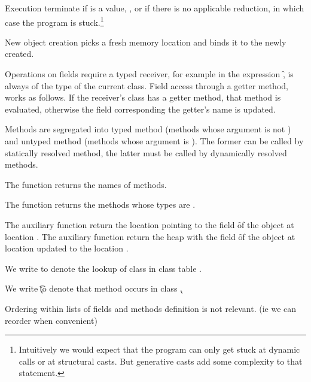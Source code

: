 \documentclass[a4paper,USenglish]{tex/lipics-v2016}
\begin{document}
Execution terminate if \ep\xspace is a value, \a, or if there is no applicable
reduction, in which case the program is stuck.\footnote{Intuitively we would
  expect that the program can only get stuck at dynamic calls or at
  structural casts. But generative casts add some complexity to that
  statement.}

New object creation picks a fresh memory location  and binds it to the
newly created.

Operations on fields require a typed receiver, for example in the expression
\Get\this\f, \this is always of the type of the current class. Field access
through a getter method, works as follows. If the receiver's class has a
getter method, that method is evaluated, otherwise the field corresponding
the getter's name is updated.

Methods are segregated into typed method (methods whose argument is not
\any) and untyped method (methods whose argument is \any). The former can be
called by statically resolved method, the latter must be called by
dynamically resolved methods.

The function \names{} returns the names of methods. 

The function \untyped{} returns the methods whose types are \any.

The auxiliary function  return the location \ap pointing to the
field \f of the object at location \a. The auxiliary function 
return the heap \sp with the field \f of the object at location \a updated
to the location \ap.

We write \App\K\C to denote the lookup of class \C in class table \K.

We write  \Mdef\m\x\t\tp\e \In \k to denote that method \m occurs in class \k.

Ordering within lists of fields and methods definition is not relevant. (ie we can reorder when convenient)
\end{document}
